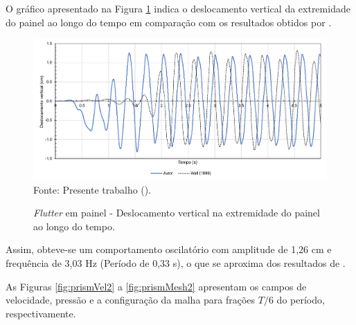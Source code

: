 O gráfico apresentado na Figura \ref{fig:prismRes} indica o deslocamento vertical da extremidade do painel ao longo do tempo em comparação com os resultados obtidos por .

\begin{figure}[h!]
    \centering
    \caption{\textit{Flutter} em painel - Deslocamento vertical na extremidade do painel ao longo do tempo.}
    \includegraphics[width=\linewidth]{Figuras/FSI-prism2/results.pdf}
    \\Fonte: Presente trabalho (\the\year).
    \label{fig:prismRes}
\end{figure}

Assim, obteve-se um comportamento oscilatório com amplitude de 1,26 cm e frequência de 3,03 Hz (Período de 0,33 s), o que se aproxima dos resultados de .

As Figuras \ref{fig:prismVel2} a \ref{fig:prismMesh2} apresentam os campos de velocidade, pressão e a configuração da malha para frações $T/6$ do período, respectivamente.

